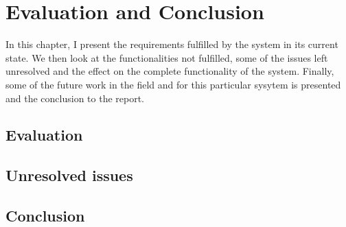\chapter{Evaluation and Conclusion}\label{ch:conclusions}
In this chapter, I present the requirements fulfilled by the system in its current state. We then look at the functionalities not fulfilled, some of the issues left unresolved and the effect on the complete functionality of the system. Finally, some of the future work in the field and for this particular sysytem is presented and the conclusion to the report.
\section{Evaluation}

\section{Unresolved issues} %

\section{Conclusion}

